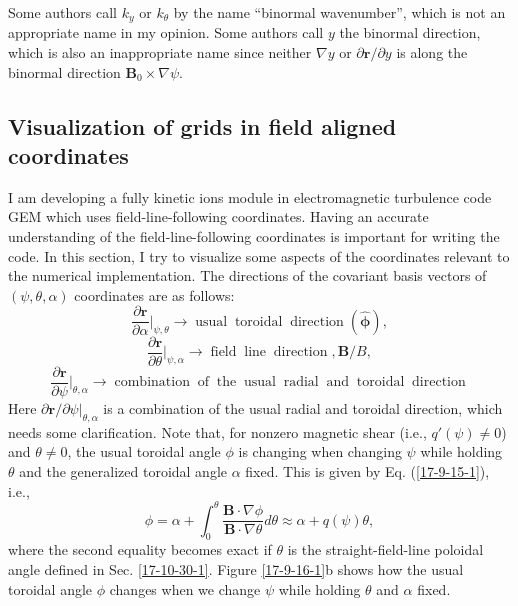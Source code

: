 \documentclass{article}
\newcommand{\nobracket}{}
\newcommand{\tmmathbf}[1]{\ensuremath{\boldsymbol{#1}}}
\newcommand{\tmop}[1]{\ensuremath{\operatorname{#1}}}
\begin{document}
Some authors call $k_y$ or $k_{\theta}$ by the name ``binormal wavenumber'',
which is not an appropriate name in my opinion. Some authors call $y$ the
binormal direction, which is also an inappropriate name since neither $\nabla
y$ or $\partial \mathbf{r}/ \partial y$ is along the binormal direction
$\mathbf{B}_0 \times \nabla \psi$.

\subsection{Visualization of grids in field aligned coordinates}

I am developing a fully kinetic ions module in electromagnetic turbulence code
GEM which uses field-line-following coordinates. Having an accurate
understanding of the field-line-following coordinates is important for writing
the code. In this section, I try to visualize some aspects of the coordinates
relevant to the numerical implementation. The directions of the covariant
basis vectors of $(\psi, \theta, \alpha)$ coordinates are as follows:
\begin{equation}
  \frac{\partial \mathbf{r}}{\partial \alpha} |_{\psi, \theta} \nobracket
  \longrightarrow \tmop{usual} \tmop{toroidal} \tmop{direction}
  (\hat{\tmmathbf{\phi}}),
\end{equation}
\begin{equation}
  \frac{\partial \mathbf{r}}{\partial \theta} |_{\psi, \alpha} \nobracket
  \longrightarrow \tmop{field} \tmop{line} \tmop{direction}, \mathbf{B}/ B,
\end{equation}
\begin{equation}
  \frac{\partial \mathbf{r}}{\partial \psi} |_{\theta, \alpha} \nobracket
  \longrightarrow \tmop{combination} \tmop{of} \tmop{the} \tmop{usual}
  \tmop{radial} \tmop{and} \tmop{toroidal} \tmop{direction}
\end{equation}
Here $\partial \mathbf{r}/ \partial \psi |_{\theta, \alpha} \nobracket$ is a
combination of the usual radial and toroidal direction, which needs some
clarification. Note that, for nonzero magnetic shear (i.e., $q' (\psi) \neq
0$) and $\theta \neq 0$, the usual toroidal angle $\phi$ is changing when
changing $\psi$ while holding $\theta$ and the generalized toroidal angle
$\alpha$ fixed. This is given by Eq. (\ref{17-9-15-1}), i.e.,
\begin{equation}
  \label{17-10-30-2} \phi = \alpha + \int_0^{\theta} \frac{\mathbf{B} \cdot
  \nabla \phi}{\mathbf{B} \cdot \nabla \theta} d \theta \approx \alpha + q
  (\psi) \theta,
\end{equation}
where the second equality becomes exact if $\theta$ is the straight-field-line
poloidal angle defined in Sec. \ref{17-10-30-1}. Figure \ref{17-9-16-1}b shows
how the usual toroidal angle $\phi$ changes when we change $\psi$ while
holding $\theta$ and $\alpha$ fixed.
\end{document}

